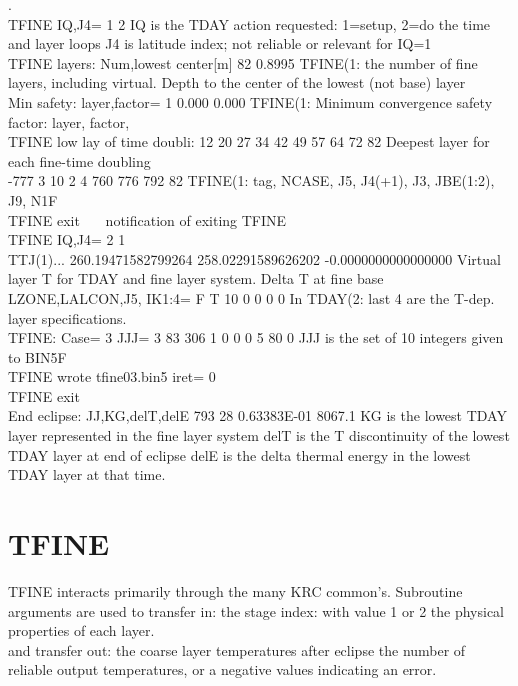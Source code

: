 \documentclass{article}
\begin{document}
. 
\\ TFINE IQ,J4=           1           2
\qi IQ is the TDAY action requested: 1=setup, 2=do the time and layer loops
\qi J4 is latitude index; not reliable or relevant for IQ=1  
\\ TFINE layers: Num,lowest center[m]   82    0.8995
\qi TFINE(1: the number of fine layers, including virtual. Depth to the center of the lowest (not base) layer
\\  Min safety: layer,factor= 1       0.000       0.000
\qi  TFINE(1: Minimum convergence safety factor: layer, factor, 
\\  TFINE low lay of time doubli:  12 20 27 34 42 49 57 64 72 82
\qi Deepest layer for each fine-time doubling
\\    -777      3     10      2      4    760    776    792     82
\qi  TFINE(1: tag, NCASE, J5, J4(+1), J3, JBE(1:2), J9, N1F
\\  TFINE exit \ \ \ notification of exiting TFINE
\\  TFINE IQ,J4=           2           1 
\qi
\\  TTJ(1)...   260.19471582799264        258.02291589626202       -0.0000000000000000 
\qi  Virtual layer T for TDAY and fine layer system. Delta T at fine base   
\\ LZONE,LALCON,J5, IK1:4=  F  T    10     0     0     0     0
\qi In TDAY(2: last 4 are the T-dep. layer specifications.
\\ TFINE: Case= 3  JJJ=    3   83  306    1    0    0    0    5   80    0
\qii JJJ is the set of 10 integers given to BIN5F
\\  TFINE wrote tfine03.bin5  iret=            0
\\  TFINE exit
\\ End eclipse: JJ,KG,delT,delE  793  28    0.63383E-01     8067.1 
\qi KG is the lowest  TDAY layer represented in the fine layer system   
\qi delT is the T discontinuity of the lowest TDAY layer at end of eclipse
\qi delE is the delta thermal energy in the lowest TDAY layer at that time.

\section{TFINE}
 TFINE interacts primarily through the many KRC common's. Subroutine arguments are used to transfer in:
\qi the stage index: with value 1 or 2
\qi the physical properties of each layer.
\\ and transfer out:
\qi the coarse layer temperatures after eclipse
\qi the number of reliable output temperatures, or a negative values indicating an error.
\end{document}

